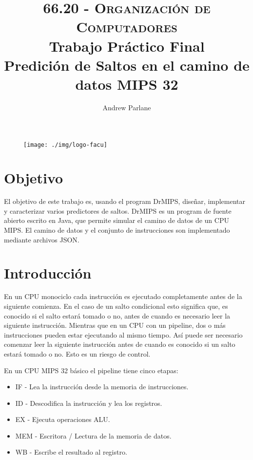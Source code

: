 \documentclass[a4paper]{article}
\begin{document}
\begin{figure}
\centering
\texttt{[image: ./img/logo-facu]}
\end{figure}

\title{\large\textsc{66.20 - Organización de Computadores}\\
\large Trabajo Práctico Final\\
Predición de Saltos en el camino de datos MIPS 32}

\author{
Andrew Parlane \\
}

\maketitle

\newpage

\tableofcontents

\listoffigures

\newpage

\section{Objetivo}

El objetivo de este trabajo es, usando el program DrMIPS, diseñar, implementar y caracterizar varios predictores de saltos. DrMIPS es un program de fuente abierto escrito en Java, que permite simular el camino de datos de un CPU MIPS. El camino de datos y el conjunto de instrucciones son implementado mediante archivos JSON.

\section{Introducción}

En un CPU monociclo cada instrucción es ejecutado completamente antes de la siguiente comienza. En el caso de un salto condicional esto significa que, es conocido si el salto estará tomado o no, antes de cuando es necesario leer la siguiente instrucción. Mientras que en un CPU con un pipeline, dos o más instrucciones pueden estar ejecutando al mismo tiempo. Así puede ser necesario comenzar leer la siguiente instrucción antes de cuando es conocido si un salto estará tomado o no. Esto es un riesgo de control.

En un CPU MIPS 32 básico el pipeline tiene cinco etapas:

\begin{itemize}
\item IF - Lea la instrucción desde la memoria de instrucciones.
\item ID - Descodifica la instrucción y lea los registros.
\item EX - Ejecuta operaciones ALU.
\item MEM - Escritora / Lectura de la memoria de datos.
\item WB - Escribe el resultado al registro.
\end{itemize}
\end{document}
